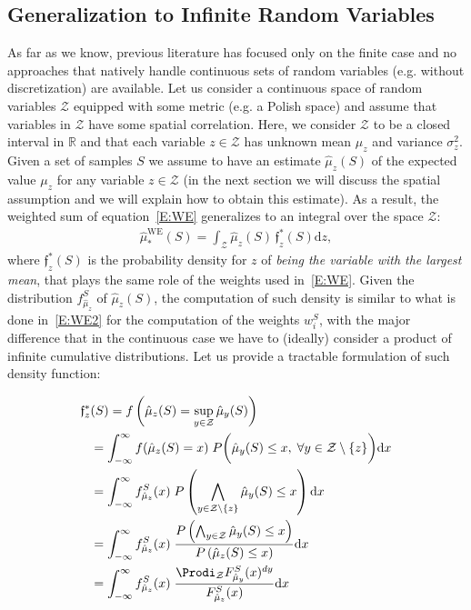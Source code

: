 \subsection{Generalization to Infinite Random Variables}
\label{S: infinite}
As far as we know, previous literature has focused only on the finite case and no approaches that natively handle continuous sets of random variables (e.g. without discretization) are available.
Let us consider a continuous space of random variables $\mathcal{Z}$ equipped with some metric (e.g. a Polish space) and assume that variables in $\mathcal{Z}$ have some spatial correlation.
Here, we consider $\mathcal{Z}$ to be a closed interval in $\mathbb{R}$ and that each variable $z \in \mathcal{Z}$ has unknown mean $\mu_z$ and variance $\sigma^2_z$.
Given a set of samples $S$ we assume to have an estimate $\hat{\mu}_z(S)$ of the expected value $\mu_z$ for any variable $z \in \mathcal{Z}$ (in the next section we will discuss the spatial assumption and we will explain how to obtain this estimate).
As a result, the weighted sum of equation~\ref{E:WE} generalizes to an integral over the space $\mathcal{Z}$:
\begin{align}\label{E:continuousWE}
\hat{\mu}_*^{\textrm{WE}}(S) = \int_{\mathcal{Z}} \hat{\mu}_z(S) \, 
\mathfrak{f}_z^*(S) \mathrm{d}z ,
\end{align}
where $\mathfrak{f}_z^*(S)$ 
is the probability density for $z$ of \emph{being the variable with the largest mean}, that plays the same role of the weights used in~\ref{E:WE}.
Given the distribution $f_{\hat{\mu}_z}^S$ of $\hat{\mu}_z(S)$, the computation of such density is similar to what is done in~\ref{E:WE2} for the computation of the weights $w_i^S$, with the major difference that in the continuous case we have to (ideally) consider a product of infinite cumulative distributions.
Let us provide a tractable formulation of such density function:

\begin{small}
\begin{align}
\nonumber \mathfrak{f}_z^*&(S) = f\left(\hat{\mu}_z(S) = \sup_{y \in \mathcal{Z}} \hat{\mu}_y(S)\right)\\
\nonumber &= \int_{-\infty}^{\infty}f(\hat{\mu}_z(S) = x) \; P \bigg( \hat{\mu}_y(S) \leq x, \; \forall y \in \mathcal{Z} \setminus \{z\} \bigg) \mathrm{d}x \\
\label{E:probability_events}
&= \int_{-\infty}^{\infty} f_{\hat{\mu}_z}^S(x) \; P \left( \bigwedge_{y \in \mathcal{Z} \setminus \{z\}} \hat{\mu}_y(S) \leq x \right) \mathrm{d}x \\
\label{E:probability_division}
&= \int_{-\infty}^{\infty} f_{\hat{\mu}_z}^S(x) \; \frac{P \left( \bigwedge_{y \in \mathcal{Z}} \hat{\mu}_y(S) \leq x \right)}{P \left( \hat{\mu}_{z}(S) \leq x \right)} \mathrm{d}x \\
\nonumber &= \int_{-\infty}^{\infty} f_{\hat{\mu}_z}^S(x) \; \frac{\Prodi_{\mathcal{Z}} F_{\hat{\mu}_y}^S(x)^{dy}}{F_{\hat{\mu}_z}^S(x)}\mathrm{d}x
\end{align}
\end{small}

